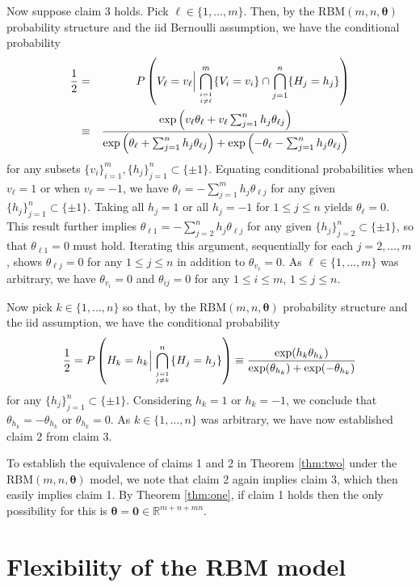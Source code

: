 \documentclass[12pt]{article}
\theoremstyle{definition}
\begin{document}
Now suppose claim 3 holds. Pick \(\ell \in \{1,\ldots,m\}\). Then, by
the RBM\((m,n,\bm{\theta})\) probability structure and the iid Bernoulli
assumption, we have the conditional probability
\begin{eqnarray*}
\frac{1}{2} &=& P\left(V_\ell = v_{\ell}\Big| \bigcap_{i=1 \atop i \neq \ell}^m \{V_i=v_i\} \cap \bigcap_{j=1}^n \{H_j=h_j\}\right) \\
&\equiv &\frac{\exp\left( v_\ell\theta_\ell +  v_\ell\sum_{j=1}^n  h_j \theta_{\ell j}\right)}{\exp\left(
\theta_\ell + \sum_{j=1}^n   h_j\theta_{\ell j} \right) +\exp\left(-\theta_\ell  -\sum_{j=1}^n  h_j\theta_{\ell j}\right) }
\end{eqnarray*}
for any subsets \(\{v_i\}_{i=1}^m,\{h_j\}_{j=1}^n \subset\{\pm 1\}\).
Equating conditional probabilities when \(v_\ell=1\) or when
\(v_\ell=-1\), we have
\(\theta_\ell = - \sum_{j=1}^m h_j \theta_{\ell j}\) for any given
\(\{h_j\}_{j=1}^n \subset \{\pm 1\}\). Taking all \(h_j=1\) or all
\(h_j=-1\) for \(1 \leq j \leq n\) yields \(\theta_\ell=0\). This result
further implies \(\theta_{\ell 1} = - \sum_{j=2}^n h_j \theta_{\ell j}\)
for any given \(\{h_j\}_{j=2}^n \subset \{\pm 1\}\), so that
\(\theta_{\ell 1}=0\) must hold. Iterating this argument, sequentially
for each \(j=2,\ldots,m\), shows \(\theta_{\ell j}=0\) for any
\(1 \leq j \leq n\) in addition to \(\theta_{v_\ell}=0\). As
\(\ell\in\{1,\ldots,m\}\) was arbitrary, we have \(\theta_{v_i}=0\) and
\(\theta_{i j}=0\) for any \(1 \leq i \leq m\), \(1 \leq j \leq n\).

Now pick \(k \in \{1,\ldots,n\}\) so that, by the
RBM\((m,n,\bm{\theta})\) probability structure and the iid assumption,
we have the conditional probability \[
 \frac{1}{2} = P\left(H_k = h_k \Big| \bigcap_{j=1 \atop j \neq k}^n \{H_j=h_j\}\right) \equiv \frac{\exp(h_k \theta_{h_k})}{\exp(\theta_{h_k}) + \exp(-\theta_{h_k})}
\] for any \(\{h_j\}_{j=1}^n \subset \{\pm 1\}\). Considering \(h_k=1\)
or \(h_k=-1\), we conclude that \(\theta_{h_k} = -\theta_{h_k}\) or
\(\theta_{h_k}=0\). As \(k \in \{1,\ldots,n\}\) was arbitrary, we have
now established claim 2 from claim 3.

To establish the equivalence of claims 1 and 2 in Theorem \ref{thm:two}
under the RBM\((m,n,\bm{\theta})\) model, we note that claim 2 again
implies claim 3, which then easily implies claim 1. By Theorem
\ref{thm:one}, if claim 1 holds then the only possibility for this is
\(\bm{\theta} = \bm{0} \in \mathbb{R}^{m+n+mn}\).

\section{Flexibility of the RBM model}\label{appendix-rbm2}
\end{document}
